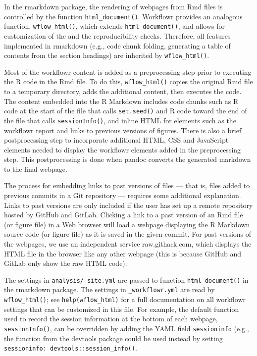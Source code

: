 \documentclass[9pt,a4paper]{extarticle}
\begin{document}
In the rmarkdown package, the rendering of webpages from Rmd files is
controlled by the function \texttt{html\_document()}. Workflowr provides an
analogous function, \texttt{wflow\_html()}, which extends \texttt{html\_document()}, and
allows for customization of the and the reproducibility checks.
Therefore, all features implemented in rmarkdown (e.g., code chunk
folding, generating a table of contents from the section headings) are
inherited by \texttt{wflow\_html()}.

Most of the workflowr content is added as a preprocessing step prior to
executing the R code in the Rmd file. To do this, \texttt{wflow\_html()} copies
the original Rmd file to a temporary directory, adds the additional
content, then executes the code. The content embedded into the R
Markdown includes code chunks such as R code at the start of the file
that calls \texttt{set.seed()} and R code toward the end of the file that calls
\texttt{sessionInfo()}, and inline HTML for elements such as the workflowr report
and links to previous versions of figures. There is also a brief
postprocessing step to incorporate additional HTML, CSS and JavaScript
elements needed to display the workflowr elements added in the
preprocessing step. This postprocessing is done when pandoc converts the
generated markdown to the final webpage.

The process for embedding links to past versions of files --- that is,
files added to previous commits in a Git repository --- requires some
additional explanation. Links to past versions are only included if the
user has set up a remote repository hosted by GitHub and GitLab.
Clicking a link to a past version of an Rmd file (or figure file) in a
Web browser will load a webpage displaying the R Markdown source code
(or figure file) as it is saved in the given commit. For past versions
of the webpages, we use an independent service raw.githack.com, which
displays the HTML file in the browser like any other webpage (this is
because GitHub and GitLab only show the raw HTML code).

The settings in \verb|analysis/_site.yml| are passed to function
\texttt{html\_document()} in the rmarkdown package. The settings in
\verb|_workflowr.yml| are read by \texttt{wflow\_html()}; see
\texttt{help(wflow\_html)} for a full documentation on all workflowr
settings that can be customized in this file. For example, the default
function used to record the session information at the bottom of each
webpage, \texttt{sessionInfo()}, can be overridden by adding the YAML field
\verb|sessioninfo| (e.g., the function from the devtools package could
be used instead by setting \verb|sessioninfo: devtools::session_info()|.
\end{document}
